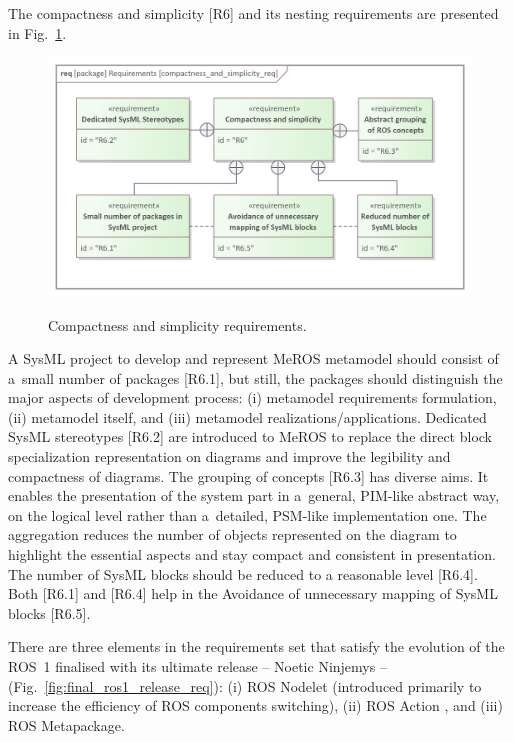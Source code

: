 \documentclass[11pt,oneside,a4paper]{article}
\begin{document}
			
	The compactness and simplicity [R6] and its nesting requirements are presented in Fig.~\ref{fig:compactness_and_simplicity_req}. 
	
	\begin{figure}[H]
		\centering
		\begin{center}
			{\includegraphics[scale=0.9]{img/requirement_pkg/compactness_and_simplicity_req.png}}
		\end{center}
		\caption{Compactness and simplicity requirements.} 
		\label{fig:compactness_and_simplicity_req}
	\end{figure}
	
	A SysML project to develop and represent MeROS metamodel should consist of a~small number of packages [R6.1], but still, the packages should distinguish the major aspects of development process: (i) metamodel requirements formulation, (ii) metamodel itself, and (iii) metamodel realizations/applications.
	Dedicated SysML stereotypes [R6.2] are introduced to MeROS to replace the direct block specialization representation on diagrams and improve the legibility and compactness of diagrams.
	The grouping of concepts [R6.3] has diverse aims. It enables the presentation of the system part in a~general, PIM-like abstract way, on the logical level rather than a~detailed, PSM-like implementation one. The aggregation reduces the number of objects represented on the diagram to highlight the essential aspects and stay compact and consistent in presentation.
	The number of SysML blocks should be reduced to a reasonable level [R6.4]. Both [R6.1] and [R6.4] help in the Avoidance of unnecessary mapping of SysML blocks [R6.5].

	There are three elements in the requirements set that satisfy the evolution of the ROS~1  finalised with its ultimate release -- Noetic Ninjemys -- (Fig.~\ref{fig:final_ros1_release_req}): (i) ROS Nodelet  (introduced primarily to increase the efficiency of ROS components switching), (ii) ROS Action , and (iii) ROS Metapackage.
	
\end{document}
